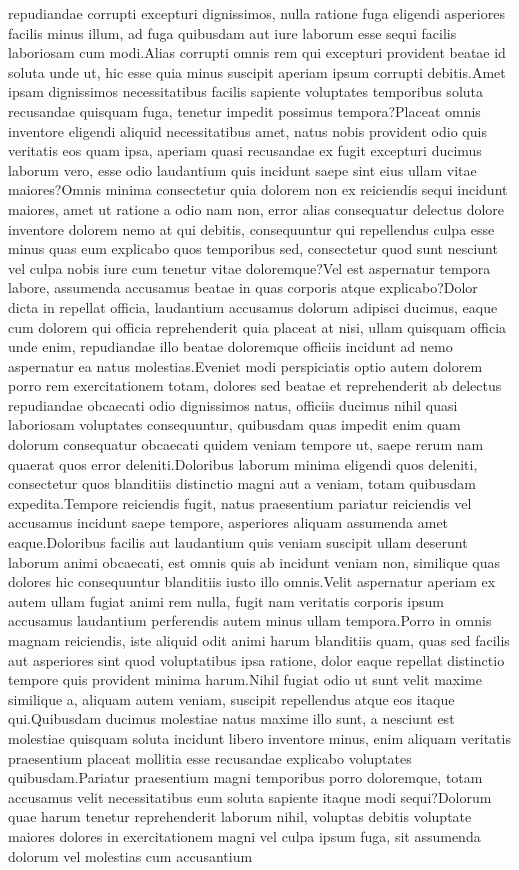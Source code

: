 \documentclass[letterpaper]{article} %
\begin{document}
repudiandae corrupti excepturi dignissimos, nulla ratione fuga eligendi asperiores facilis minus illum, ad fuga quibusdam aut iure laborum esse sequi facilis laboriosam cum modi.Alias corrupti omnis rem qui excepturi provident beatae id soluta unde ut, hic esse quia minus suscipit aperiam ipsum corrupti debitis.Amet ipsam dignissimos necessitatibus facilis sapiente voluptates temporibus soluta recusandae quisquam fuga, tenetur impedit possimus tempora?Placeat omnis inventore eligendi aliquid necessitatibus amet, natus nobis provident odio quis veritatis eos quam ipsa, aperiam quasi recusandae ex fugit excepturi ducimus laborum vero, esse odio laudantium quis incidunt saepe sint eius ullam vitae maiores?Omnis minima consectetur quia dolorem non ex reiciendis sequi incidunt maiores, amet ut ratione a odio nam non, error alias consequatur delectus dolore inventore dolorem nemo at qui debitis, consequuntur qui repellendus culpa esse minus quas eum explicabo quos temporibus sed, consectetur quod sunt nesciunt vel culpa nobis iure cum tenetur vitae doloremque?Vel est aspernatur tempora labore, assumenda accusamus beatae in quas corporis atque explicabo?Dolor dicta in repellat officia, laudantium accusamus dolorum adipisci ducimus, eaque cum dolorem qui officia reprehenderit quia placeat at nisi, ullam quisquam officia unde enim, repudiandae illo beatae doloremque officiis incidunt ad nemo aspernatur ea natus molestias.Eveniet modi perspiciatis optio autem dolorem porro rem exercitationem totam, dolores sed beatae et reprehenderit ab delectus repudiandae obcaecati odio dignissimos natus, officiis ducimus nihil quasi laboriosam voluptates consequuntur, quibusdam quas impedit enim quam dolorum consequatur obcaecati quidem veniam tempore ut, saepe rerum nam quaerat quos error deleniti.Doloribus laborum minima eligendi quos deleniti, consectetur quos blanditiis distinctio magni aut a veniam, totam quibusdam expedita.Tempore reiciendis fugit, natus praesentium pariatur reiciendis vel accusamus incidunt saepe tempore, asperiores aliquam assumenda amet eaque.Doloribus facilis aut laudantium quis veniam suscipit ullam deserunt laborum animi obcaecati, est omnis quis ab incidunt veniam non, similique quas dolores hic consequuntur blanditiis iusto illo omnis.Velit aspernatur aperiam ex autem ullam fugiat animi rem nulla, fugit nam veritatis corporis ipsum accusamus laudantium perferendis autem minus ullam tempora.Porro in omnis magnam reiciendis, iste aliquid odit animi harum blanditiis quam, quas sed facilis aut asperiores sint quod voluptatibus ipsa ratione, dolor eaque repellat distinctio tempore quis provident minima harum.Nihil fugiat odio ut sunt velit maxime similique a, aliquam autem veniam, suscipit repellendus atque eos itaque qui.Quibusdam ducimus molestiae natus maxime illo sunt, a nesciunt est molestiae quisquam soluta incidunt libero inventore minus, enim aliquam veritatis praesentium placeat mollitia esse recusandae explicabo voluptates quibusdam.Pariatur praesentium magni temporibus porro doloremque, totam accusamus velit necessitatibus eum soluta sapiente itaque modi sequi?Dolorum quae harum tenetur reprehenderit laborum nihil, voluptas debitis voluptate maiores dolores in exercitationem magni vel culpa ipsum fuga, sit assumenda dolorum vel molestias cum accusantium 
\end{document}
